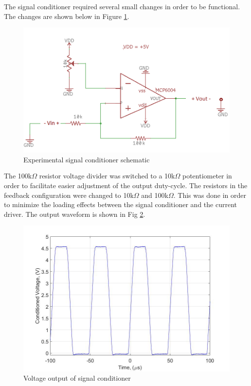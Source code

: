 
	
The signal conditioner required several small changes in order to be functional. The changes are shown below in Figure \ref{fig:signalconditionerexperimentalschem}.


\begin{figure}
	\centering
	\includegraphics[width=0.7\linewidth]{SignalConditionerExperimentalSchem}
	\caption{Experimental signal conditioner schematic}
	\label{fig:signalconditionerexperimentalschem}
\end{figure}

 The 100k$\Omega$ resistor voltage divider was switched to a 10k$\Omega$ potentiometer in order to facilitate easier adjustment of the output duty-cycle. The resistors in the feedback configuration were changed to 10k$\Omega$ and 100k$\Omega$. This was done in order to minimize the loading effects between the signal conditioner and the current driver. The output waveform is shown in Fig \ref{fig:conditionedvoltagelab4}.

\begin{figure}[H]
	\centering
	\includegraphics[width=0.7\linewidth]{ExperimentalImplementation/conditioned_voltage_lab4}
	\caption[Experimental signal conditioner]{Voltage output of signal conditioner}
	\label{fig:conditionedvoltagelab4}
\end{figure}

